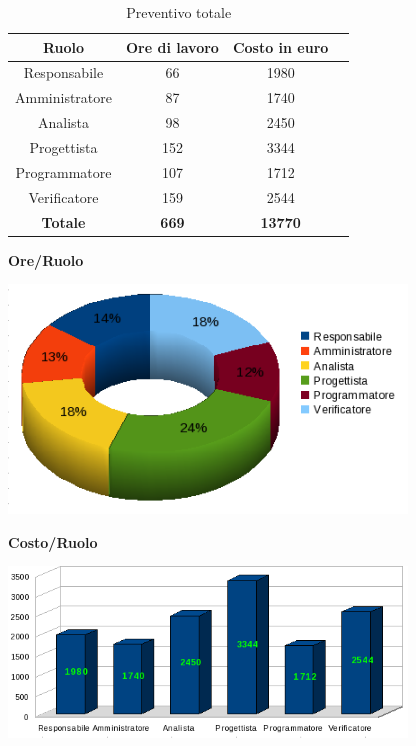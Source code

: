 \begin{table}[h]
	\begin{center}
		  \begin{tabular}{|c|c|c|c|}
		 \hline 
		 \textbf{Ruolo} & \textbf{Ore di lavoro} & \textbf{Costo in euro}\\
		 \hline
		Responsabile & 66 & 1980 \\
		Amministratore & 87 & 1740\\
		Analista & 98 & 2450\\
		Progettista & 152 & 3344\\
		Programmatore & 107 & 1712 \\
		Verificatore & 159 & 2544\\
        \hline
        \textbf{Totale} & \textbf{669} & \textbf{13770}\\
		\hline
		\end{tabular}
	\caption{Preventivo totale} 
	\label{tab:tabella_preventivo}
	\end{center}	
\end{table}

\newpage
\begin{center}\textbf{Ore/Ruolo}
\end{center}
\includegraphics[width=300pt]{Ore_Totali}

\begin{center}\textbf{Costo/Ruolo}
\end{center}
\includegraphics[width=300pt]{Costi_Totali}

